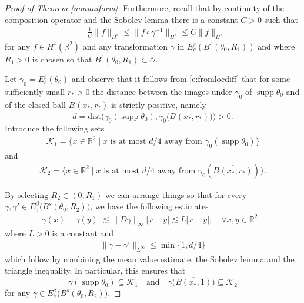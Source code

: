 \documentclass[11pt]{amsart}
\numberwithin{equation}{section}
\begin{document}
\begin{proof}[Proof of Theorem \ref{nonuniform}]
Furthermore, recall that by continuity of the composition operator and the Sobolev lemma there is a constant $C>0$ such that
	\begin{align}
		&\frac{1}{C} \|f\|_{H^s} \leq \|f \circ \gamma^{-1}\|_{H^s} \leq C \|f\|_{H^s} \label{bdd}
    \end{align}
	for any $f \in H^s(\mathbb R^2)$ and any transformation $\gamma$ in $E_{e}^{_{\beta}}(B_{}^s(\theta_0,R_1))$ and where $R_1 > 0$ is chosen so that $B_{}^s(\theta_0,R_1)\subset \mathcal{O}$.
    
Let $\gamma_0= E_{e}^{_{\beta}}(\theta_0)$ and observe that it follows from \eqref{e:fromlocdiff} that for some sufficiently small $r_*>0$ the distance between the images under $\gamma_0$ of $\operatorname{supp}\theta_0$ and of the closed ball $\overline{B_{}(x_*,r_*)}$ is strictly positive, namely
    $$d=
    \mathrm{dist}
    \Big(\gamma_0(
    \operatorname{supp}
    \theta_0),\gamma_0\big(\overline{B_{}(x_*,r_*)}\big)\Big)>0.$$
Introduce the following sets
    	\begin{align}
    	    \mathcal{K}_1=\big\{ x \in \mathbb R^2 \; | \; x \text{  is at most } d/4 \text{ away from } \gamma_0(\operatorname{supp}\theta_0)\big\} 
    	\end{align}
and
\begin{align}
    \mathcal{K}_2=\big\{ x \in \mathbb R^2 \; | \; x \text{  is at most } d/4 \text{ away from }\gamma_0(\overline{B_{}(x_*,r_*)})  \big\}.
\end{align}	
     
	By selecting $R_2 \in (0,R_1)$ we can arrange things so that for every $\gamma, \gamma' \in E_e^{\beta}\big(B_{}^s(\theta_0,R_2)\big)$, we have the following estimates
	\begin{align}
	|\gamma(x)-\gamma(y)| \lesssim \|D\gamma\|_{\infty}|x-y|\lesssim L |x-y|,\quad \forall x,y \in \mathbb R^2 \quad \end{align}
  where $L>0$ is a constant and
  \begin{align}
 \|\gamma-\gamma'\|_{L^\infty} \leq \min\{1,d/4\}
	\end{align}
    which follow by combining the mean value estimate, the Sobolev lemma and the triangle inequality.
In particular, this ensures that
	\[
	\gamma(\operatorname{supp}\theta_0) \subseteq \mathcal{K}_1 \quad \mbox{and} \quad \gamma\big(\overline{B(x_*,1)}\big) \subseteq \mathcal{K}_2
	\]
	for any $\gamma \in E_e^{\beta}\big(B_{}^s(\theta_0,R_2)\big)$. 
    

\end{proof}
\end{document}

